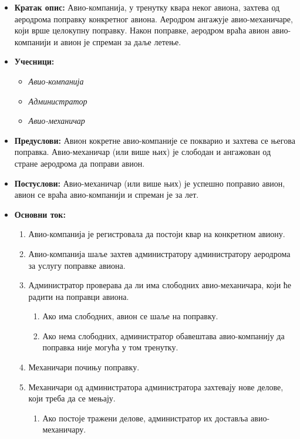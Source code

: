 \documentclass{article}
\begin{document}
\begin{itemize}
    \item \textbf{Кратак опис:} Авио-компанија, у тренутку квара неког авиона, захтева од аеродрома поправку конкретног авиона. Аеродром ангажује авио-механичаре, који врше целокупну поправку. Након поправке, аеродром враћа авион авио-компанији и авион је спреман за даље летење.
    \item \textbf{Учесници:}
        \begin{itemize}
            \item \textit{Авио-компанија}
            \item \textit{Администратор}
            \item \textit{Авио-механичар}
        \end{itemize}
    \item \textbf{Предуслови:} Авион кокретне авио-компаније се покварио и захтева се његова поправка. Авио-механичар (или више њих) је слободан и ангажован од стране аеродрома да поправи авион.
    \item \textbf{Постуслови:} Авио-механичар (или више њих) је успешно поправио авион, авион се враћа авио-компанији и спреман је за лет.
    \item \textbf{Основни ток:}
        \begin{enumerate}
            \item Авио-компанија је регистровала да постоји квар на конкретном авиону.
            \item Авио-компанија шаље захтев администратору администратору аеродрома за услугу поправке авиона. %
            \item Администратор проверава да ли има слободних авио-механичара, који ће радити на поправци авиона.
                \begin{enumerate}
                    \item Ако има слободних, авион се шаље на поправку.
                    \item Ако нема слободних, администратор обавештава авио-компанију да поправка није могућа у том тренутку.
                \end{enumerate}
            \item Механичари почињу поправку.
            \item Механичари од администратора администратора захтевају нове делове, који треба да се мењају.
                \begin{enumerate}
                    \item Ако постоје тражени делове, администратор их доставља авио-механичару.

\end{enumerate}
\end{enumerate}
\end{itemize}
\end{document}

